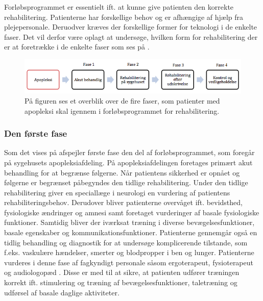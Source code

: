 Forløbsprogrammet er essentielt ift. at kunne give patienten den korrekte rehabilitering. Patienterne har forskellige behov og er afhængige af hjælp fra plejepersonale. Deruodver kræves der forskellige former for teknologi i de enkelte faser. Det vil derfor være oplagt at undersøge, hvilken form for rehabilitering der er at foretrække i de enkelte faser som ses på .

\begin{figure}[H]
	\centering
	\includegraphics[scale=1.2]{figures/bProblemanalyse/flowdiagram_faser1.png}
	\caption{På figuren ses et overblik over de fire faser, som patienter med apopleksi skal igennem i forløbsprogrammet for rehabilitering. \cite{Sundhedsstyrelsen2011a}} 
	\label{firefaser}
\end{figure}

\subsubsection{Den første fase}
Som det vises på  afspejler første fase den del af forløbsprogrammet, som foregår på sygehusets apopleksiafdeling. På apopleksiafdelingen foretages primært akut behandling for at begrænse følgerne. Når patientens sikkerhed er opnået og følgerne er begrænset påbegyndes den tidlige rehabilitering. Under den tidlige rehabilitering giver en speciallæge i neurologi en vurdering af patientens rehabiliteringsbehov. Derudover bliver patienterne overvåget ift. bevidsthed, fysiologiske ændringer og amnesi samt foretaget vurderinger af basale fysiologiske funktioner. Samtidig bliver der iværksat træning i diverse bevægelsesfunktioner, basale egenskaber og kommunikationsfunktioner. Patienterne gennemgår også en tidlig behandling og diagnostik for at undersøge komplicerende tilstande, som f.eks. vaskulære hændelser, smerter og blodpropper i ben og lunger. Patienterne vurderes i denne fase af fagkyndigt personale såsom ergoterapeut, fysioterapeut og audiologopæd . Disse er med til at sikre, at patienten udfører træningen korrekt ift. stimulering og træning af bevægelsesfunktioner, taletræning og udførsel af basale daglige aktiviteter. \cite{Sundhedsstyrelsen2011a}

